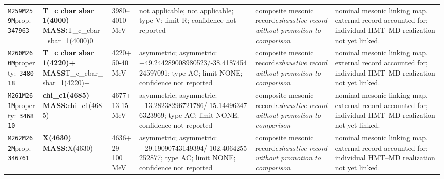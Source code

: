 \begin{landscape}
\begin{longtable}{L{1.85cm}L{4.45cm}L{2.35cm}L{4.05cm}L{3.35cm}L{7.15cm}}
\texttt{M259}\newline \texttt{M259M}\newline prop.\ \texttt{347963} & \textbf{T\_\allowbreak{}c cbar sbar 1(4000) MASS:}\newline T\_\allowbreak{}c\_\allowbreak{}cbar\_\allowbreak{}sbar\_\allowbreak{}1(4000)0 & 3980--4010\,MeV & not applicable; not applicable; type V; limit R; confidence not reported & composite mesonic record\newline \emph{exhaustive record without promotion to comparison} & nominal mesonic linking map. external record accounted for; individual HMT--MD realization not yet linked. \\
\texttt{M260}\newline \texttt{M260M}\newline property:\ \texttt{348018} & \textbf{T\_\allowbreak{}c cbar sbar 1(4220)+ MASS}\newline T\_\allowbreak{}c\_\allowbreak{}cbar\_\allowbreak{}sbar\_\allowbreak{}1(4220)+ & 4220+50-40\,MeV & asymmetric; asymmetric: +49.244289008980523/-38.418745424597091; type AC; limit NONE; confidence not reported & composite mesonic record\newline \emph{exhaustive record without promotion to comparison} & nominal mesonic linking map. external record accounted for; individual HMT--MD realization not yet linked. \\
\texttt{M261}\newline \texttt{M261M}\newline property:\ \texttt{346810} & \textbf{chi\_\allowbreak{}c1(4685) MASS:}\newline chi\_\allowbreak{}c1(4685) & 4677+13-15\,MeV & asymmetric; asymmetric: +13.28238296721786/-15.144963476323969; type AC; limit NONE; confidence not reported & composite mesonic record\newline \emph{exhaustive record without promotion to comparison} & nominal mesonic linking map. external record accounted for; individual HMT--MD realization not yet linked. \\
\texttt{M262}\newline \texttt{M262M}\newline prop.\ \texttt{346761} & \textbf{X(4630) MASS:}\newline X(4630) & 4636+29-100\,MeV & asymmetric; asymmetric: +29.19090743149394/-102.4064255252877; type AC; limit NONE; confidence not reported & composite mesonic record\newline \emph{exhaustive record without promotion to comparison} & nominal mesonic linking map. external record accounted for; individual HMT--MD realization not yet linked. \\

\end{longtable}
\end{landscape}
